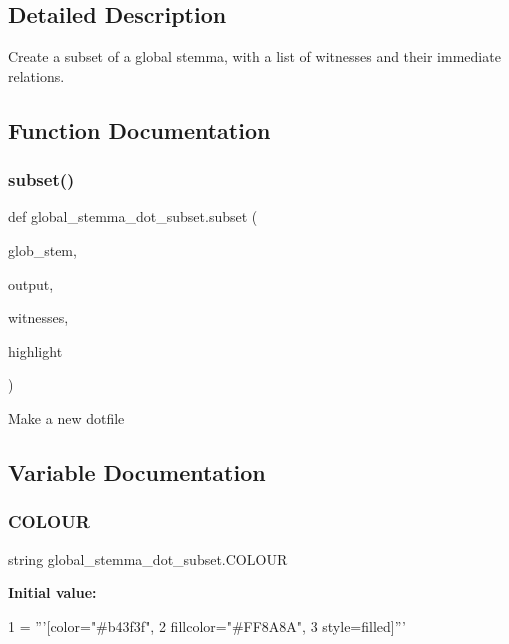 \subsection{Detailed Description}
\begin{DoxyVerb}Create a subset of a global stemma, with a list of witnesses and their immediate relations.
\end{DoxyVerb}
 

\subsection{Function Documentation}
\mbox{\label{namespaceglobal__stemma__dot__subset_aed22752c43fa819ba5d14b55ffe8c3ed}} 
\subsubsection{\texorpdfstring{subset()}{subset()}}
{\footnotesize\ttfamily def global\+\_\+stemma\+\_\+dot\+\_\+subset.\+subset (\begin{DoxyParamCaption}\item[{}]{glob\+\_\+stem,  }\item[{}]{output,  }\item[{}]{witnesses,  }\item[{}]{highlight }\end{DoxyParamCaption})}

\begin{DoxyVerb}Make a new dotfile
\end{DoxyVerb}
 

\subsection{Variable Documentation}
\mbox{\label{namespaceglobal__stemma__dot__subset_a5c177c0b498e0380d4d500c3b6757130}} 
\subsubsection{\texorpdfstring{C\+O\+L\+O\+UR}{COLOUR}}
{\footnotesize\ttfamily string global\+\_\+stemma\+\_\+dot\+\_\+subset.\+C\+O\+L\+O\+UR}

{\bfseries Initial value\+:}
\begin{DoxyCode}
1 =  \textcolor{stringliteral}{'''[color="#b43f3f",}
2 \textcolor{stringliteral}{             fillcolor="#FF8A8A",}
3 \textcolor{stringliteral}{             style=filled]'''}
\end{DoxyCode}
